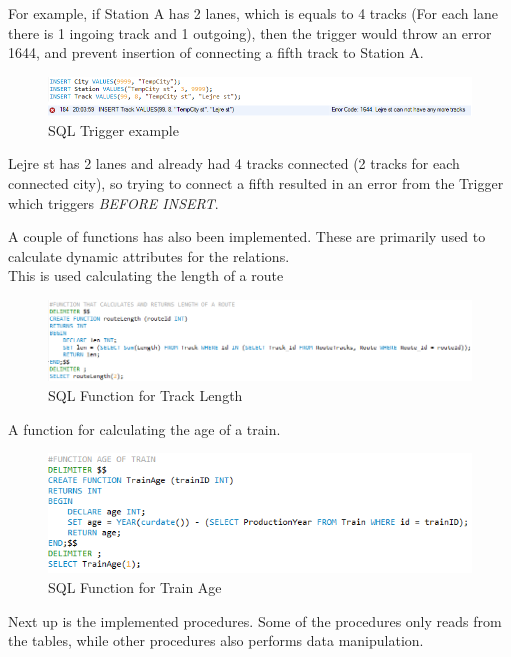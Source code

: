 For example, if Station A has 2 lanes, which is equals to 4 tracks (For each lane there is 1 ingoing track and 1 outgoing), then the trigger would throw an error 1644, and prevent insertion of connecting a fifth track to Station A.

\begin{figure}[ht!]
    \centering
    \includegraphics[width=1\textwidth]{img/SQL_TRIGGER_example}
    \caption{SQL Trigger example}
\end{figure}

Lejre st has 2 lanes and already had 4 tracks connected (2 tracks for each connected city), so trying to connect a fifth resulted in an error from the Trigger which triggers \emph{BEFORE INSERT}.

A couple of functions has also been implemented. These are primarily used to calculate dynamic attributes for the relations.\\
This is used calculating the length of a route

\begin{figure}[ht!]
    \centering
    \includegraphics[width=1\textwidth]{img/SQL_FUNCTION_Length}
    \caption{SQL Function for Track Length}
\end{figure}
\newpage

A function for calculating the age of a train.

\begin{figure}[ht!]
    \centering
    \includegraphics[width=1\textwidth]{img/SQL_FUNCTION_Age}
    \caption{SQL Function for Train Age}
\end{figure}

Next up is the implemented procedures. Some of the procedures only reads from the tables, while other procedures also performs data manipulation.

